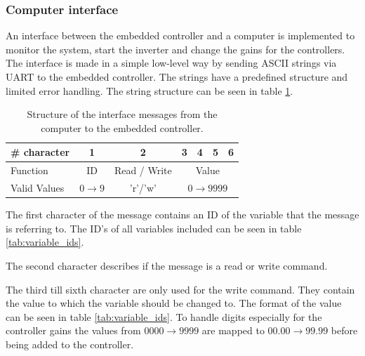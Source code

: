 \subsubsection{Computer interface}
An interface between the embedded controller and a computer is implemented to monitor the system, start the inverter and change the gains for the controllers. The interface is made in a simple low-level way by sending ASCII strings via UART to the embedded controller. The strings have a predefined structure and limited error handling. The string structure can be seen in table \ref{tab:message_structure}. 


\begin{table}[H]
    \centering
    \small
    \begin{tabular}{|l|c|c|c|c|c|c|}
        \hline
        \# character       & 1       & 2                 & 3            & 4            & 5       & 6   \\ \hline
        Function      & ID  & Read / Write                     & \multicolumn{4}{c|}{Value}               \\ \hline
        Valid Values & $0\rightarrow 9$ & 'r'/'w'  & \multicolumn{4}{c|}{$0\rightarrow 9999$} \\ \hline
    \end{tabular}
    \caption{Structure of the interface messages from the computer to the embedded controller.}
    \label{tab:message_structure}
\end{table}

The first character of the message contains an ID of the variable that the message is referring to. The ID's of all variables included can be seen in table \ref{tab:variable_ids}.

The second character describes if the message is a read or write command.

The third till sixth character are only used for the write command. They contain the value to which the variable should be changed to. The format of the value can be seen in table \ref{tab:variable_ids}. To handle digits especially for the controller gains the values from $0000 \rightarrow 9999$ are mapped to $00.00 \rightarrow 99.99$ before being added to the controller.


